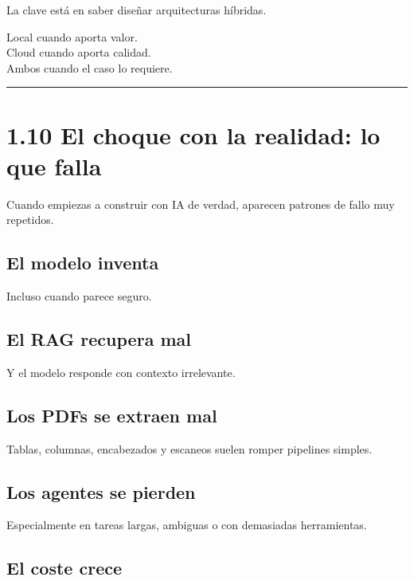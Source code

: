 La clave está en saber diseñar arquitecturas híbridas.

Local cuando aporta valor.\\
Cloud cuando aporta calidad.\\
Ambos cuando el caso lo requiere.

\begin{center}\rule{0.5\linewidth}{0.5pt}\end{center}

\section{1.10 El choque con la realidad: lo que
falla}\label{el-choque-con-la-realidad-lo-que-falla}

Cuando empiezas a construir con IA de verdad, aparecen patrones de fallo
muy repetidos.

\subsection{El modelo inventa}\label{el-modelo-inventa}

Incluso cuando parece seguro.

\subsection{El RAG recupera mal}\label{el-rag-recupera-mal}

Y el modelo responde con contexto irrelevante.

\subsection{Los PDFs se extraen mal}\label{los-pdfs-se-extraen-mal}

Tablas, columnas, encabezados y escaneos suelen romper pipelines
simples.

\subsection{Los agentes se pierden}\label{los-agentes-se-pierden}

Especialmente en tareas largas, ambiguas o con demasiadas herramientas.

\subsection{El coste crece}\label{el-coste-crece}

